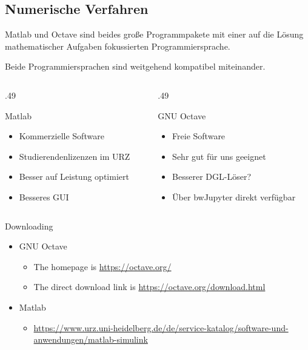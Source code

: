 \subsection{Numerische Verfahren}

\begin{frame}
  Matlab und Octave sind beides große Programmpakete mit einer auf die
  Lösung mathematischer Aufgaben fokussierten Programmiersprache.

  Beide Programmiersprachen sind weitgehend kompatibel miteinander.

  \begin{columns}
    \begin{column}[t]{.49\textwidth}
      \begin{block}{Matlab}
        \begin{itemize}
        \item Kommerzielle Software
        \item Studierendenlizenzen im URZ
        \item Besser auf Leistung optimiert
        \item Besseres GUI
        \end{itemize}
      \end{block}
    \end{column}
    \begin{column}[t]{.49\textwidth}
      \begin{block}{GNU Octave}
        \begin{itemize}
        \item Freie Software
        \item Sehr gut für uns geeignet
        \item Besserer DGL-Löser?
        \item Über bwJupyter direkt verfügbar
        \end{itemize}
      \end{block}
    \end{column}
  \end{columns}
\end{frame}

\begin{frame}{Downloading}

  \begin{itemize}
  \item GNU Octave
    \begin{itemize}
    \item The homepage is \url{https://octave.org/}
    \item The direct download link is \url{https://octave.org/download.html}
    \end{itemize}
  \item Matlab
    \begin{itemize}
    \item
      \url{https://www.urz.uni-heidelberg.de/de/service-katalog/software-und-anwendungen/matlab-simulink}
    \end{itemize}
  \end{itemize}
\end{frame}

